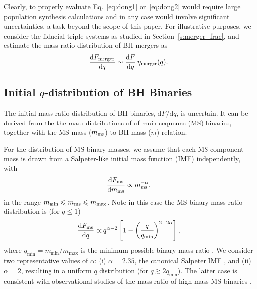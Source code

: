 \documentclass[
        fleqn,
        usenatbib,
    ]{mnras}
\newcommand*{\md}[0]{\mathrm{d}}
\begin{document}
Clearly, to properly evaluate Eq.~\eqref{eq:dong1} or~\eqref{eq:dong2} would
require large population synthesis calculations and in any case would involve
significant uncertainties, a task beyond the scope of this paper. For
illustrative purposes, we consider the fiducial triple systems as studied in
Section~\ref{s:merger_frac}, and estimate the mass-ratio distribution of BH
mergers as
\begin{align}
   {\md F_{\rm merger}\over \md q}\sim {\md F\over \md q}\, \eta_{\rm merger}(q).
    \label{eq:gmerge_dq}
\end{align}

\subsection{Initial $q$-distribution of BH Binaries}\label{ss:qdist_init}

The initial mass-ratio distribution of BH binaries, $\md F/\md q$, is uncertain.
It can be derived from the the mass distributions of of main-sequence (MS)
binaries, together with the MS mass ($m_{\rm ms}$) to BH mass ($m$) relation.

For the distribution of MS binary masses, we assume that each MS component mass
is drawn from a Salpeter-like initial mass function (IMF) independently, with
\begin{align}
    {\md F_{\rm ms} \over \md m_{\rm ms} }\propto m_{\rm ms}^{-\alpha},
        \label{eq:def_alpha}
\end{align}
in the range $m_{\min}\le m_{\rm ms} \leq m_{\max}$. Note in this case the MS
binary mass-ratio distribution is (for $q\leq 1$)
\begin{align}
    {\md F_{\rm ms}\over \md q}\propto q^{\alpha -2}
        \left[ 1-\left( \frac{q}{q_{\min}}\right)^{2-2\alpha}\right],
\end{align}
where $q_{\min} = m_{\min}/m_{\max}$ is the minimum possible binary mass ratio
\citep[this is a generalization of the result of][]{tout_dist}. We consider two
representative values of $\alpha$: (i) $\alpha = 2.35$, the canonical Salpeter
IMF \citep{salpeter1955luminosity}, and (ii) $\alpha = 2$, resulting in a
uniform $q$ distribution (for $q \gtrsim 2q_{\min}$). The latter case is
consistent with observational studies of the mass ratio of high-mass MS binaries
\citep{sana2012binary, duchene2013, kobulnicky2014, moe2017mind}.
\end{document}
